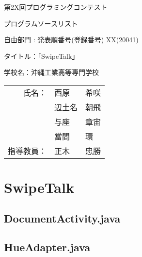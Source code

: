 \documentclass[11pt,a4j]{jarticle}
\begin{document}
\vspace*{-20mm}
{\Large

\begin{flushleft}
第2X回プログラミングコンテスト
\end{flushleft}

\vspace{-15mm}
\begin{flushright}
プログラムソースリスト
\end{flushright}
}

\vspace{20mm}

\begin{center}
{\huge

{自由部門 : 発表順番号(登録番号)  XX(20041)}

\vspace{20mm}
タイトル：「SwipeTalk」


\vspace{20mm}
学校名：沖縄工業高等専門学校\\

\hspace{0mm}
\vspace{0mm}

\begin{tabular}{r l l}
氏名：& 西原 & 希咲\\
	 & 辺土名 & 朝飛 \\
	 & 与座 & 章宙 \\
	 & 當間 & 環 \\
指導教員：& 正木 & 忠勝 \\
\end{tabular}
}

\end{center}


\thispagestyle{empty}
\newpage
\setcounter{page}{1}



\tableofcontents


\thispagestyle{empty}
\newpage
\setcounter{page}{1}




\section{SwipeTalk}
\subsection{DocumentActivity.java}
	
	\newpage
\subsection{HueAdapter.java}
	
	\newpage	
\end{document}
